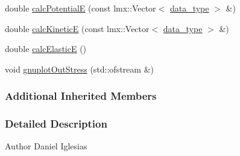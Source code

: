 \begin{DoxyCompactItemize}
\item 
double \hyperlink{classmknix_1_1_gauss_point_a8b0e8f05d6fe32c24fc5a4f5912c306b}{calc\-Potential\-E} (const lmx\-::\-Vector$<$ \hyperlink{namespacemknix_a16be4b246fbf2cceb141e3a179111020}{data\-\_\-type} $>$ \&)
\item 
double \hyperlink{classmknix_1_1_gauss_point_a0c646ea6fd6888438b2f51ff7e3c0e9d}{calc\-Kinetic\-E} (const lmx\-::\-Vector$<$ \hyperlink{namespacemknix_a16be4b246fbf2cceb141e3a179111020}{data\-\_\-type} $>$ \&)
\item 
double \hyperlink{classmknix_1_1_gauss_point_a43f19e4df71c710f9150b834cb956f89}{calc\-Elastic\-E} ()
\item 
void \hyperlink{classmknix_1_1_gauss_point_a6d80a71224082e0ff5ab6c69d8a5bf58}{gnuplot\-Out\-Stress} (std\-::ofstream \&)
\end{DoxyCompactItemize}
\subsubsection*{Additional Inherited Members}


\subsubsection{Detailed Description}
\begin{DoxyAuthor}{Author}
Daniel Iglesias 
\end{DoxyAuthor}


